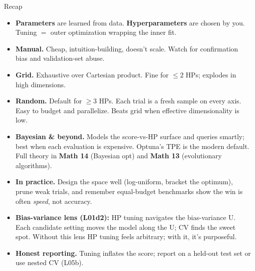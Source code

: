 \documentclass[aspectratio=169]{beamer}
\begin{document}
\begin{frame}{Recap}
  \begin{itemize}\small
    \item \textbf{Parameters} are learned from data. \textbf{Hyperparameters} are chosen by you. Tuning $=$ outer optimization wrapping the inner fit.
    \item \textbf{Manual.} Cheap, intuition-building, doesn't scale. Watch for confirmation bias and validation-set abuse.
    \item \textbf{Grid.} Exhaustive over Cartesian product. Fine for $\leq 2$ HPs; explodes in high dimensions.
    \item \textbf{Random.} Default for $\geq 3$ HPs. Each trial is a fresh sample on every axis. Easy to budget and parallelize. Beats grid when effective dimensionality is low.
    \item \textbf{Bayesian \& beyond.} Models the score-vs-HP surface and queries smartly; best when each evaluation is expensive. Optuna's TPE is the modern default. Full theory in \textbf{Math 14} (Bayesian opt) and \textbf{Math 13} (evolutionary algorithms).
    \item \textbf{In practice.} Design the space well (log-uniform, bracket the optimum), prune weak trials, and remember equal-budget benchmarks show the win is often \emph{speed}, not accuracy.
    \item \textbf{Bias-variance lens (L01d2):} HP tuning navigates the bias-variance U. Each candidate setting moves the model along the U; CV finds the sweet spot. Without this lens HP tuning feels arbitrary; with it, it's purposeful.
    \item \textbf{Honest reporting.} Tuning inflates the score; report on a held-out test set or use nested CV (L05b).
  \end{itemize}
\end{frame}
\end{document}
